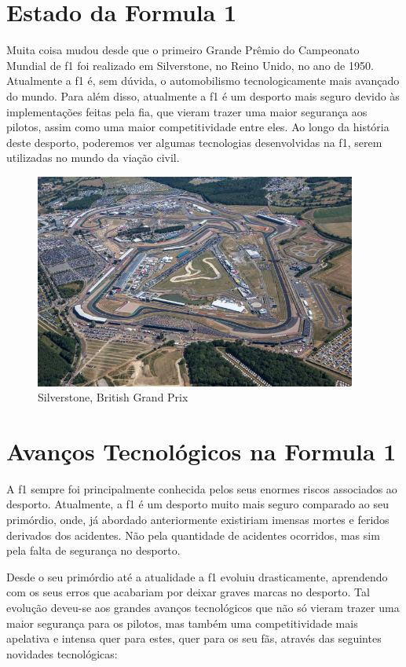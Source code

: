 \documentclass{report}
\begin{document}
\chapter{Estado da Formula 1}
Muita coisa mudou desde que o primeiro Grande Prêmio do Campeonato Mundial de \ac{f1} foi realizado em Silverstone, no Reino Unido, no ano de 1950. Atualmente a \ac{f1} é, sem dúvida, o automobilismo tecnologicamente mais avançado do mundo. Para além disso, atualmente a \ac{f1} é um desporto mais seguro devido às implementações feitas pela \ac{fia}, que vieram trazer uma maior segurança aos pilotos, assim como uma maior competitividade entre eles. Ao longo da história deste desporto, poderemos ver algumas tecnologias desenvolvidas na \ac{f1}, serem utilizadas no mundo da viação civil.
\begin{figure}[h]
\center %
\includegraphics[height=200pt]{silverstone}
\caption{Silverstone, British Grand Prix}
\label{fig:silverstone}
\end{figure}

\chapter{Avanços Tecnológicos na Formula 1}
A \ac{f1} sempre foi principalmente conhecida pelos seus enormes riscos associados ao desporto. Atualmente, a \ac{f1} é um desporto muito mais seguro comparado ao seu primórdio, onde, já abordado anteriormente existiriam imensas mortes e feridos derivados dos acidentes. Não pela quantidade de acidentes ocorridos, mas sim pela falta de segurança no desporto.


Desde o seu primórdio até a atualidade a \ac{f1} evoluiu drasticamente, aprendendo com os seus erros que acabariam por deixar graves marcas no desporto. Tal evolução deveu-se aos grandes avanços tecnológicos que não só vieram trazer uma maior segurança para os pilotos, mas também uma competitividade mais apelativa e intensa quer para estes, quer para os seu fãs, através das seguintes novidades tecnológicas:
\end{document}
